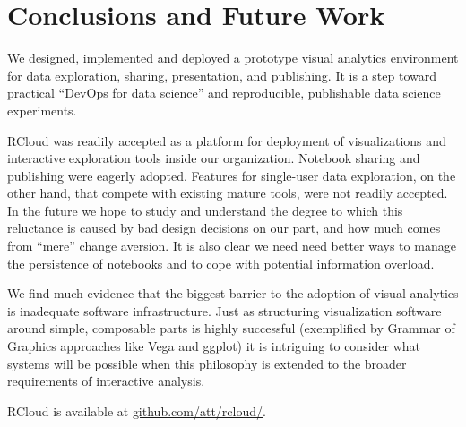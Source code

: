\section{Conclusions and Future Work}
We designed, implemented and deployed a prototype visual analytics environment
for data exploration, sharing, presentation, and publishing. It is a step toward
practical ``DevOps for data science'' and reproducible, publishable data
science experiments.

RCloud was readily accepted as a platform for deployment of
visualizations and interactive exploration tools inside our organization.  
Notebook sharing and publishing were eagerly adopted.
Features for single-user data exploration, on the other hand, that
compete with existing mature tools, were not readily accepted.
In the future we hope to study and understand the degree to which
this reluctance is caused by bad design decisions on our part, and how
much comes from ``mere'' change aversion. It is also clear we need
need better ways to manage the persistence of notebooks and to cope
with potential information overload.

We find much evidence that the biggest barrier to the adoption of
visual analytics is inadequate software infrastructure.
Just as structuring visualization software around simple,
composable parts is highly successful (exemplified by
Grammar of Graphics approaches like Vega and ggplot)
it is intriguing to consider what systems will be
possible when this philosophy is extended to the
broader requirements of interactive analysis.

RCloud is available at \url{github.com/att/rcloud/}.
